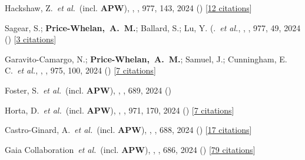 \item[{\color{deemph}\scriptsize132}]Hackshaw, Z.~\textit{et al.}~(incl. \textbf{APW}), , \apj, 977, 143, 2024 () [\href{http://adsabs.harvard.edu/abs/2024ApJ...977..143H}{12 citations}]

\item[{\color{deemph}\scriptsize131}]Sagear, S.; \textbf{Price-Whelan,~A.~M.}; Ballard, S.; Lu, Y. (.~\textit{et al.}, , \apj, 977, 49, 2024 () [\href{http://adsabs.harvard.edu/abs/2024ApJ...977...49S}{3 citations}]

\item[{\color{deemph}\scriptsize130}]Garavito-Camargo, N.; \textbf{Price-Whelan,~A.~M.}; Samuel, J.; Cunningham, E. C.~\textit{et al.}, , \apj, 975, 100, 2024 () [\href{http://adsabs.harvard.edu/abs/2024ApJ...975..100G}{7 citations}]

\item[{\color{deemph}\scriptsize129}]Foster, S.~\textit{et al.}~(incl. \textbf{APW}), , \aanda, 689, 2024 ()

\item[{\color{deemph}\scriptsize128}]Horta, D.~\textit{et al.}~(incl. \textbf{APW}), , \apj, 971, 170, 2024 () [\href{http://adsabs.harvard.edu/abs/2024ApJ...971..170H}{7 citations}]

\item[{\color{deemph}\scriptsize127}]Castro-Ginard, A.~\textit{et al.}~(incl. \textbf{APW}), , \aanda, 688, 2024 () [\href{http://adsabs.harvard.edu/abs/2024A&A...688A...1C}{17 citations}]

\item[{\color{deemph}\scriptsize126}]Gaia Collaboration~\textit{et al.}~(incl. \textbf{APW}), , \aanda, 686, 2024 () [\href{http://adsabs.harvard.edu/abs/2024A&A...686L...2G}{79 citations}]

